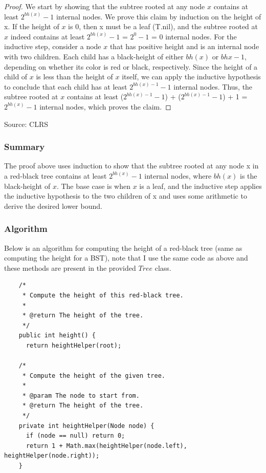 \documentclass[10pt]{article}
\begin{document}
  \begin{proof}
    We start by showing that the subtree rooted at any node $x$ contains at least
    $2^{bh(x)}- 1$ internal nodes. We prove this claim by induction on the
    height of x. If the height of $x$ is 0, then x must be a leaf (T.nil), and the
    subtree rooted at $x$ indeed contains at least $2^{bh(x)}- 1$ = $2^{0}- 1$ =
    0 internal nodes. For the inductive step, consider a node $x$ that has positive
    height and is an internal node with two children. Each child has a black-height
    of either $bh(x)$ or $bhx - 1$, depending on whether its color is red or black,
    respectively. Since the height of a child of $x$ is less than the height of $x$
    itself, we can apply the inductive hypothesis to conclude that each child
    has at least $2^{bh(x) - 1}- 1$ internal nodes. Thus, the subtree rooted at
    $x$ contains at least ($2^{bh(x) - 1}- 1$) + ($2^{bh(x) - 1}- 1$) + 1 =
    $2^{bh(x)}- 1$ internal nodes, which proves the claim.
  \end{proof}

  \noindent
  Source: CLRS

  \subsubsection*{Summary}


  The proof above uses induction to show that the subtree rooted at any node x
  in a red-black tree contains at least $2^{bh(x)}- 1$ internal nodes, where $bh(
  x)$ is the black-height of $x$. The base case is when $x$ is a leaf, and the inductive
  step applies the inductive hypothesis to the two children of x and uses some arithmetic
  to derive the desired lower bound.

  \subsubsection*{Algorithm}


  Below is an algorithm for computing the height of a red-black tree (same as
  computing the height for a BST), note that I use the same code as above and
  these methods are present in the provided $Tree$ class.

  \begin{verbatim}
    /*
     * Compute the height of this red-black tree.
     *
     * @return The height of the tree.
     */
    public int height() {
      return heightHelper(root);

    /*
     * Compute the height of the given tree.
     *
     * @param The node to start from.
     * @return The height of the tree.
     */
    private int heightHelper(Node node) {
      if (node == null) return 0;
      return 1 + Math.max(heightHelper(node.left), heightHelper(node.right));
    }
  \end{verbatim}
\end{document}
